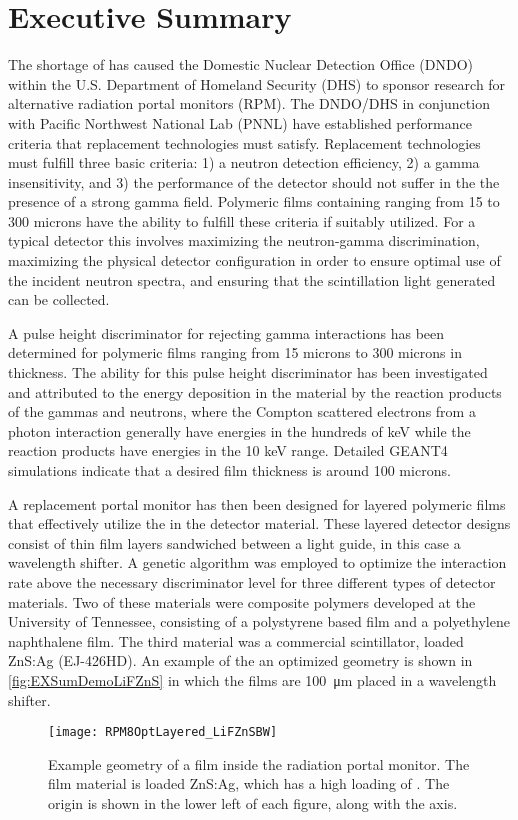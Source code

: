 \chapter*{Executive Summary}
The shortage of  has caused the Domestic Nuclear Detection Office (DNDO) within the U.S. Department of Homeland Security (DHS) to sponsor research for alternative radiation portal monitors (RPM).
The DNDO/DHS in conjunction with Pacific Northwest National Lab (PNNL) have established performance criteria that replacement technologies must satisfy.
Replacement technologies must fulfill three basic criteria: 1) a neutron detection efficiency, 2) a gamma insensitivity, and 3) the performance of the detector should not suffer in the the presence of a strong gamma field.
Polymeric films containing  ranging from 15 to 300 microns have the ability to fulfill these criteria if suitably utilized.
For a typical detector this involves maximizing the neutron-gamma discrimination, maximizing the physical detector configuration in order to ensure optimal use of the incident neutron spectra, and ensuring that the scintillation light generated can be collected.

A pulse height discriminator for rejecting gamma interactions has been determined for polymeric films ranging from 15 microns to 300 microns in thickness. 
The ability for this pulse height discriminator has been investigated and attributed to the energy deposition in the material by the reaction products of the gammas and neutrons, where the Compton scattered electrons from a photon interaction generally have energies in the hundreds of keV while the  reaction products have energies in the 10 keV range. 
Detailed GEANT4 simulations indicate that a desired film thickness is around 100 microns. 

A replacement portal monitor has then been designed for layered polymeric films that effectively utilize the  in the detector material. 
These layered detector designs consist of thin film layers sandwiched between a light guide, in this case a wavelength shifter.
A genetic algorithm was employed to optimize the interaction rate above the necessary discriminator level for three different types of detector materials.
Two of these materials were composite polymers developed at the University of Tennessee, consisting of a polystyrene based film and a polyethylene naphthalene film.
The third material was a commercial scintillator,  loaded ZnS:Ag (EJ-426HD).
An example of the an optimized geometry is shown in \autoref{fig:EXSumDemoLiFZnS} in which the films are \SI{100}{\um} placed in a wavelength shifter.
\begin{figure}
  \centering
  \texttt{[image: RPM8OptLayered\_LiFZnSBW]}
  \caption[]{Example geometry of a film inside the radiation portal monitor. The film material is  loaded ZnS:Ag, which has a high loading of . The origin is shown in the lower left of each figure, along with the axis.}
  \label{fig:EXSumDemoLiFZnS}
\end{figure}

